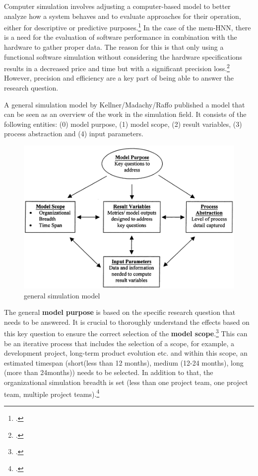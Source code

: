 Computer simulation involves adjusting a computer-based model to better analyze how a system behaves and to evaluate approaches for their operation, either for descriptive or predictive purposes.\footcite[cf.][13-14]{abarAgentBasedModelling2017}
In the case of the \ac{mem-HNN}, there is a need for the evaluation of software performance in combination with the hardware to gather proper data.
The reason for this is that only using a functional software simulation without considering the hardware specifications results in a decreased price and time but with a significant precision loss.\footcite[cf.][470-471]{sarhadiStateArtHardware2015}
However, precision and efficiency are a key part of being able to answer the research question.

A general simulation model by Kellner/Madachy/Raffo published a model that can be seen as an overview of the work in the simulation field.
It consists of the following entities: (0) model purpose, (1) model scope, (2) result variables, (3) process abstraction and (4) input parameters.  

\begin{figure}[H]
    \centering
    \includegraphics[width=0.7\linewidth]{graphics/Simulation_Modell.png}
    \caption{general simulation model\protect\footnotemark}
    \label{simulation_Modell}
\end{figure}

The general \textbf{model purpose} is based on the specific research question that needs to be answered.
It is crucial to thoroughly understand the effects based on this key question to ensure the correct selection of the \textbf{model scope}.\footcite[cf.][95]{kellnerSoftwareProcessSimulation1999}
This can be an iterative process that includes the selection of a scope, for example, a development project, long-term product evolution etc. and within 
this scope, an estimated timespan (short(less than 12 months), medium (12-24 months), long (more than 24months)) needs to be selected. 
In addition to that, the organizational simulation breadth is set (less than one project team, one project team, multiple project teams).\footcite[cf.][96]{kellnerSoftwareProcessSimulation1999}

